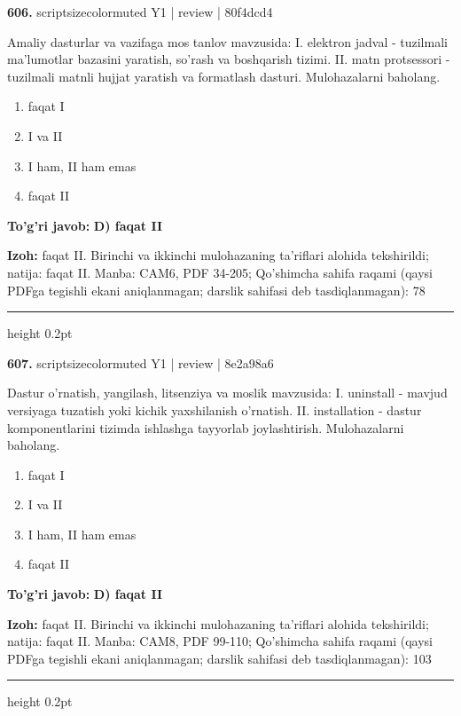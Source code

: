 \documentclass[10pt,a4paper]{article}
\begin{document}
{\bfseries\sffamily\color{ink} 606.} {scriptsizecolor{muted} Y1 | review | 80f4dcd4}
\par
Amaliy dasturlar va vazifaga mos tanlov mavzusida: I. elektron jadval - tuzilmali ma'lumotlar bazasini yaratish, so'rash va boshqarish tizimi. II. matn protsessori - tuzilmali matnli hujjat yaratish va formatlash dasturi. Mulohazalarni baholang.
\begin{enumerate}[label=\Alph*),leftmargin=9mm]
\item faqat I
\item I va II
\item I ham, II ham emas
\item faqat II
\end{enumerate}
\begin{tcolorbox}[enhanced,breakable,colback=teal!4,colframe=teal!60!black,boxrule=0.45pt,arc=1.2mm,left=2.7mm,right=2.7mm,top=1.8mm,bottom=1.8mm,before skip=2mm,after skip=2mm]
{\bfseries\sffamily\color{teal}To'g'ri javob:} \textbf{D) faqat II}
\par\smallskip
{\bfseries Izoh:} faqat II. Birinchi va ikkinchi mulohazaning ta'riflari alohida tekshirildi; natija: faqat II. Manba: CAM6, PDF 34-205; Qo'shimcha sahifa raqami (qaysi PDFga tegishli ekani aniqlanmagan; darslik sahifasi deb tasdiqlanmagan): 78
\end{tcolorbox}
\vspace{2mm}\hrule height 0.2pt\vspace{3mm}

{\bfseries\sffamily\color{ink} 607.} {scriptsizecolor{muted} Y1 | review | 8e2a98a6}
\par
Dastur o'rnatish, yangilash, litsenziya va moslik mavzusida: I. uninstall - mavjud versiyaga tuzatish yoki kichik yaxshilanish o'rnatish. II. installation - dastur komponentlarini tizimda ishlashga tayyorlab joylashtirish. Mulohazalarni baholang.
\begin{enumerate}[label=\Alph*),leftmargin=9mm]
\item faqat I
\item I va II
\item I ham, II ham emas
\item faqat II
\end{enumerate}
\begin{tcolorbox}[enhanced,breakable,colback=teal!4,colframe=teal!60!black,boxrule=0.45pt,arc=1.2mm,left=2.7mm,right=2.7mm,top=1.8mm,bottom=1.8mm,before skip=2mm,after skip=2mm]
{\bfseries\sffamily\color{teal}To'g'ri javob:} \textbf{D) faqat II}
\par\smallskip
{\bfseries Izoh:} faqat II. Birinchi va ikkinchi mulohazaning ta'riflari alohida tekshirildi; natija: faqat II. Manba: CAM8, PDF 99-110; Qo'shimcha sahifa raqami (qaysi PDFga tegishli ekani aniqlanmagan; darslik sahifasi deb tasdiqlanmagan): 103
\end{tcolorbox}
\vspace{2mm}\hrule height 0.2pt\vspace{3mm}
\end{document}

